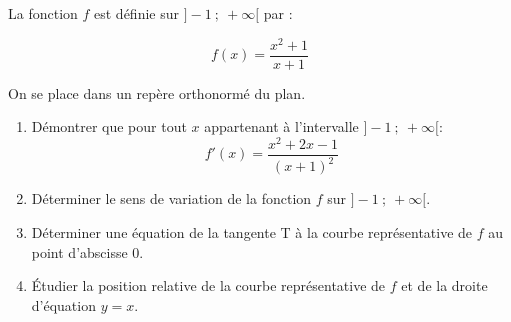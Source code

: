 \medskip

La fonction $f$ est définie sur $]-1~;~+\infty[$ par :

\[f(x) =\dfrac{ x^2 + 1}{x + 1}\]

On se place dans un repère orthonormé du plan.

\begin{enumerate}
\item  Démontrer que pour tout $x$ appartenant à l’intervalle $]-1~;~ +\infty[$:
\[f'(x) =\dfrac{x^2 + 2x - 1}{(x + 1)^2}\]
\item Déterminer le sens de variation de la fonction $f$ sur $]-1~;~+\infty[$.
\item Déterminer une équation de la tangente T à la courbe représentative
de $f$ au point d’abscisse $0$.
\item Étudier la position relative de la courbe représentative de $f$ et de la
droite d'équation $y = x$.
\end{enumerate}

\vspace{1cm}
